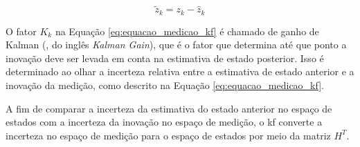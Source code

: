 \documentclass[acronym, symbols, table]{fei}
\begin{document}
				\begin{equation} \label{eq:equacao_inovacao_medicao}
					\tilde{z}_k = z_k - \hat{z}_k
				\end{equation}
				
%				
%			
				
				O fator $K_k$ na Equação \eqref{eq:equacao_medicao_kf} é chamado de ganho de Kalman (, do inglês \textit{Kalman Gain}), que é o fator que determina até que ponto a inovação deve ser levada em conta na estimativa de estado posterior. Isso é determinado ao olhar a incerteza relativa entre a estimativa de estado anterior e a inovação da medição, como descrito na Equação \eqref{eq:equacao_medicao_kf}.
				
				A fim de comparar a incerteza da estimativa do estado anterior no espaço de estados com a incerteza da inovação no espaço de medição, o \acrshort{kf} converte a incerteza no espaço de medição para o espaço de estados por meio da matriz $H^T$.
				
\end{document}
